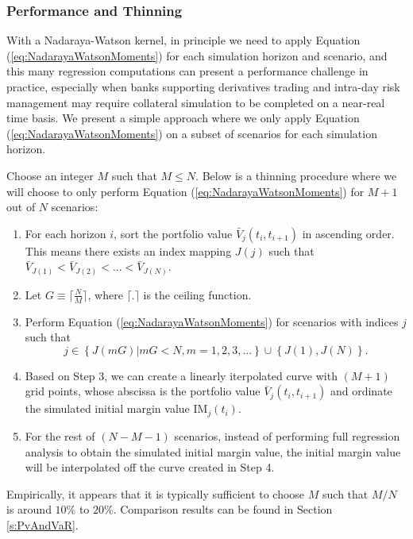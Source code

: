 \documentclass[preprint,12pt]{elsarticle}
\begin{document}
\subsubsection{Performance and Thinning}
With a Nadaraya-Watson kernel, in principle we need to apply Equation (\ref{eq:NadarayaWatsonMoments}) for each simulation horizon and scenario, and this many regression computations can present a performance challenge in practice, especially when banks supporting derivatives trading and intra-day risk management may require collateral simulation to be completed on a near-real time basis. We present a simple approach where we only apply Equation (\ref{eq:NadarayaWatsonMoments}) on a subset of scenarios for each simulation horizon.

Choose an integer $M$ such that $M\le N$. Below is a thinning procedure where we will choose to only perform Equation (\ref{eq:NadarayaWatsonMoments}) for $M+1$ out of $N$ scenarios:
\begin{enumerate}
\item For each horizon $i$, sort the portfolio value $\bar{V}_{j}(t_{i},t_{i+1})$ in ascending order. This means there exists an index mapping $J(j)$ such that $\bar{V}_{J(1)}<\bar{V}_{J(2)}<...<\bar{V}_{J(N)}$. 
\item Let $G\equiv\lceil\frac{N}{M}\rceil$, where $\lceil.\rceil$ is the ceiling function. 
\item Perform Equation (\ref{eq:NadarayaWatsonMoments}) for scenarios with indices $j$ such that
\begin{equation}
j\in\left\{ J(mG)|mG<N,m=1,2,3,...\right\} \cup\left\{ J(1),J(N)\right\}.
\end{equation}
\item Based on Step 3, we can create a linearly iterpolated curve with $(M+1)$ grid points, whose abscissa is the portfolio value $\bar{V}_{j}(t_{i},t_{i+1})$ and ordinate the simulated initial margin value $\textrm{IM}_{j}(t_{i})$.
\item For the rest of $(N-M-1)$ scenarios, instead of performing full regression analysis to obtain the simulated initial margin value, the initial margin value will be interpolated off the curve created in Step 4.
\end{enumerate}
Empirically, it appears that it is typically sufficient to choose $M$ such that $M/N$ is around $10\%$ to $20\%$. Comparison results can be found in Section \ref{s:PvAndVaR}.
\end{document}
